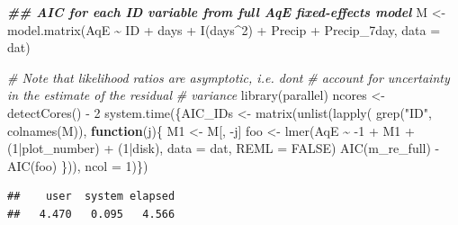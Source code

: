 \documentclass[
  ignorenonframetext,
]{beamer}
\newenvironment{Shaded}{\begin{snugshade}}{\end{snugshade}}
\newcommand{\AttributeTok}[1]{\textcolor[rgb]{0.77,0.63,0.00}{#1}}
\newcommand{\CommentTok}[1]{\textcolor[rgb]{0.56,0.35,0.01}{\textit{#1}}}
\newcommand{\ConstantTok}[1]{\textcolor[rgb]{0.00,0.00,0.00}{#1}}
\newcommand{\ControlFlowTok}[1]{\textcolor[rgb]{0.13,0.29,0.53}{\textbf{#1}}}
\newcommand{\DecValTok}[1]{\textcolor[rgb]{0.00,0.00,0.81}{#1}}
\newcommand{\DocumentationTok}[1]{\textcolor[rgb]{0.56,0.35,0.01}{\textbf{\textit{#1}}}}
\newcommand{\FunctionTok}[1]{\textcolor[rgb]{0.00,0.00,0.00}{#1}}
\newcommand{\NormalTok}[1]{#1}
\newcommand{\OtherTok}[1]{\textcolor[rgb]{0.56,0.35,0.01}{#1}}
\newcommand{\SpecialCharTok}[1]{\textcolor[rgb]{0.00,0.00,0.00}{#1}}
\newcommand{\StringTok}[1]{\textcolor[rgb]{0.31,0.60,0.02}{#1}}
\begin{document}
\begin{frame}[fragile]{}
\protect\hypertarget{section-18}{}
\small

\begin{Shaded}
\begin{Highlighting}[]
\DocumentationTok{\#\# AIC for each ID variable from full AqE fixed{-}effects model}
\NormalTok{M }\OtherTok{\textless{}{-}} \FunctionTok{model.matrix}\NormalTok{(AqE }\SpecialCharTok{\textasciitilde{}}\NormalTok{ ID }\SpecialCharTok{+}\NormalTok{ days }\SpecialCharTok{+} \FunctionTok{I}\NormalTok{(days}\SpecialCharTok{\^{}}\DecValTok{2}\NormalTok{) }\SpecialCharTok{+}\NormalTok{ Precip }\SpecialCharTok{+} 
\NormalTok{                    Precip\_7day, }\AttributeTok{data =}\NormalTok{ dat)}

\CommentTok{\# Note that likelihood ratios are asymptotic, i.e. don\textquotesingle{}t }
\CommentTok{\# account for uncertainty in the estimate of the residual }
\CommentTok{\# variance}
\FunctionTok{library}\NormalTok{(parallel)}
\NormalTok{ncores }\OtherTok{\textless{}{-}} \FunctionTok{detectCores}\NormalTok{() }\SpecialCharTok{{-}} \DecValTok{2}
\FunctionTok{system.time}\NormalTok{(\{AIC\_IDs }\OtherTok{\textless{}{-}} \FunctionTok{matrix}\NormalTok{(}\FunctionTok{unlist}\NormalTok{(}\FunctionTok{lapply}\NormalTok{(}
    \FunctionTok{grep}\NormalTok{(}\StringTok{"ID"}\NormalTok{, }\FunctionTok{colnames}\NormalTok{(M)), }\ControlFlowTok{function}\NormalTok{(j)\{}
\NormalTok{    M1 }\OtherTok{\textless{}{-}}\NormalTok{ M[, }\SpecialCharTok{{-}}\NormalTok{j]   }
\NormalTok{    foo }\OtherTok{\textless{}{-}} \FunctionTok{lmer}\NormalTok{(AqE }\SpecialCharTok{\textasciitilde{}} \SpecialCharTok{{-}}\DecValTok{1} \SpecialCharTok{+}\NormalTok{ M1 }\SpecialCharTok{+}\NormalTok{ (}\DecValTok{1}\SpecialCharTok{|}\NormalTok{plot\_number) }\SpecialCharTok{+}\NormalTok{ (}\DecValTok{1}\SpecialCharTok{|}\NormalTok{disk), }
                            \AttributeTok{data =}\NormalTok{ dat, }\AttributeTok{REML =} \ConstantTok{FALSE}\NormalTok{)}
    \FunctionTok{AIC}\NormalTok{(m\_re\_full) }\SpecialCharTok{{-}} \FunctionTok{AIC}\NormalTok{(foo) }
\NormalTok{\})), }\AttributeTok{ncol =} \DecValTok{1}\NormalTok{)\})}
\end{Highlighting}
\end{Shaded}

\begin{verbatim}
##    user  system elapsed 
##   4.470   0.095   4.566
\end{verbatim}
\end{frame}
\end{document}
